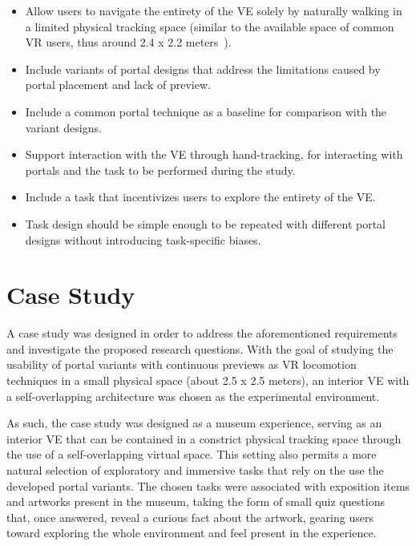\begin{itemize}
  \item Allow users to navigate the entirety of the \gls{VE} solely by naturally walking in a limited physical tracking space (similar to 
  the available space of common \gls{VR} users, thus around 2.4 x 2.2 meters~\cite{Azmandian2015, Liu2018b}).
  
  \item Include variants of portal designs that address the limitations caused by portal placement and lack of preview.
  
  \item Include a common portal technique as a baseline for comparison with the variant designs.

  \item Support interaction with the \gls{VE} through hand-tracking, for interacting with portals and the task to be performed during the study.
 
  \item Include a task that incentivizes users to explore the entirety of the \gls{VE}.
  
  \item Task design should be simple enough to be repeated with different portal designs without introducing task-specific biases. 
  
\end{itemize}

\section{Case Study}
\label{sec:case-study}

A case study was designed in order to address the aforementioned requirements and investigate the proposed research questions. 
With the goal of studying the usability of portal variants with continuous previews as \gls{VR} locomotion techniques in a small 
physical space (about 2.5 x 2.5 meters), an interior \gls{VE} with a self-overlapping architecture was chosen as the experimental 
environment.

As such, the case study was designed as a museum experience, serving as an interior \gls{VE} that can be contained in a constrict physical tracking 
space through the use of a self-overlapping virtual space. This setting also permits a more natural selection of exploratory and 
immersive tasks that rely on the use the developed portal variants. The chosen tasks were associated with exposition items and artworks 
present in the museum, taking the form of small quiz questions that, once answered, reveal a curious fact about the artwork, gearing users 
toward exploring the whole environment and feel present in the experience.

